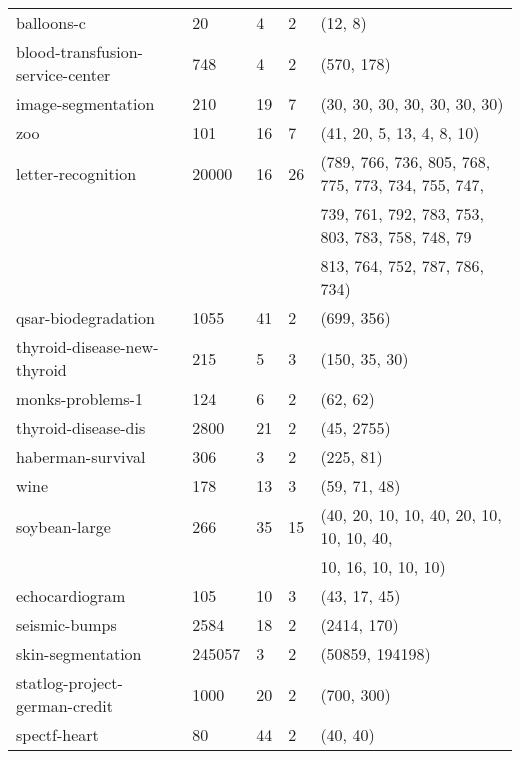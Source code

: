 \documentclass{article}%
\begin{document}
\begin{longtable}{l l l l l}
balloons{-}c&20&4&2&(12, 8)\\%
blood{-}transfusion{-}service{-}center&748&4&2&(570, 178)\\%
image{-}segmentation&210&19&7&(30, 30, 30, 30, 30, 30, 30)\\%
zoo&101&16&7&(41, 20, 5, 13, 4, 8, 10)\\%
letter{-}recognition&20000&16&26&(789, 766, 736, 805, 768, 775, 773, 734, 755, 747,\\%
&&&&739, 761, 792, 783, 753, 803, 783, 758, 748, 79\\%
&&&&813, 764, 752, 787, 786, 734)\\%
qsar{-}biodegradation&1055&41&2&(699, 356)\\%
thyroid{-}disease{-}new{-}thyroid&215&5&3&(150, 35, 30)\\%
monks{-}problems{-}1&124&6&2&(62, 62)\\%
thyroid{-}disease{-}dis&2800&21&2&(45, 2755)\\%
haberman{-}survival&306&3&2&(225, 81)\\%
wine&178&13&3&(59, 71, 48)\\%
soybean{-}large&266&35&15&(40, 20, 10, 10, 40, 20, 10, 10, 10, 40,\\%
&&&&10, 16, 10, 10, 10)\\%
echocardiogram&105&10&3&(43, 17, 45)\\%
seismic{-}bumps&2584&18&2&(2414, 170)\\%
skin{-}segmentation&245057&3&2&(50859, 194198)\\%
statlog{-}project{-}german{-}credit&1000&20&2&(700, 300)\\%
spectf{-}heart&80&44&2&(40, 40)\\%
\end{longtable}%
\end{document}
